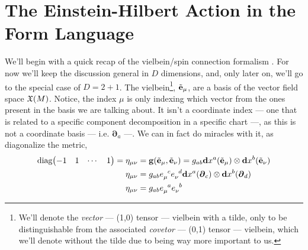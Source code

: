 \section{The Einstein-Hilbert Action in the Form Language}

We'll begin with a quick recap of the vielbein/spin connection formalism \cite{wald,carlip,gravitation,donnay}. For now we'll keep the discussion general in $D$ dimensions, and, 
only later on, we'll go to the special case of $D=2+1$. The vielbein\footnote{We'll denote the \textit{vector} --- (1,0) tensor --- vielbein with a tilde, only to be distinguishable from the 
associated \textit{covetor} --- (0,1) tensor --- vielbein, which we'll denote without the tilde due to being way more important to us.}, $\tilde{\vb e}_\mu$, are a basis of the vector field space $\mathfrak X\qty(M)$. Notice, 
the index $\mu$ is only indexing which vector from the ones present in the basis we are talking about. It isn't a coordinate index --- one that is 
related to a specific component decomposition in a specific chart ---, as this is not a coordinate basis --- i.e. $\boldsymbol\partial_a$ ---. We can 
in fact do miracles with it, as diagonalize the metric,
\begin{align*}
    \textnormal{diag}\mqty(-1& 1&\cdots&1)=\eta_{\mu\nu}&=\vb g\qty(\tilde{\vb e}_\mu,\tilde{\vb e}_\nu)=g_{ab}\vb d{x^a}\qty(\tilde{\vb e}_\mu)\otimes\vb d{x^b}\qty(\tilde{\vb e}_\nu)\\
    \eta_{\mu\nu}&=g_{ab}\tensor{e}{_\mu^c}\tensor{e}{_\nu^d}\vb d{x^a}\qty(\boldsymbol\partial_c)\otimes\vb d{x^b}\qty(\boldsymbol\partial_d)\\
    \eta_{\mu\nu}&=g_{ab}\tensor{e}{_\mu^a}\tensor{e}{_\nu^b}
\end{align*}

